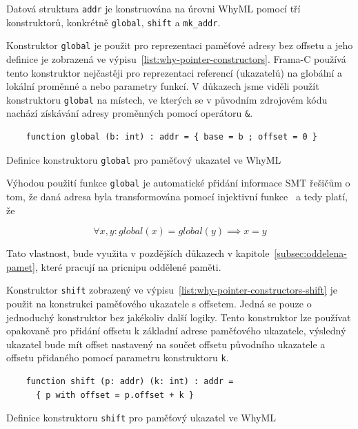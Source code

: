 Datová struktura \texttt{addr} je konstruována na úrovni WhyML pomocí tří konstruktorů,
konkrétně \texttt{global}, \texttt{shift} a \texttt{mk\_addr}.

Konstruktor \texttt{global} je použit pro reprezentaci paměťové adresy bez offsetu
a jeho definice je zobrazená ve výpisu~\ref{list:why-pointer-constructors}.
Frama\mbox{-}C používá tento konstruktor nejčastěji
pro reprezentaci referencí (ukazatelů) na globální a lokální proměnné a nebo parametry funkcí.
V důkazech jsme viděli použít konstruktoru \texttt{global} na místech,
ve kterých se v původním zdrojovém kódu nachází získávání adresy proměnných pomocí operátoru \texttt{\&}.

\begin{listing}[H]
    \begin{verbatim}
    function global (b: int) : addr = { base = b ; offset = 0 }
    \end{verbatim}
    \caption{Definice konstruktoru \texttt{global} pro paměťový ukazatel ve WhyML}
    \label{list:why-pointer-constructors}
\end{listing}

Výhodou použití funkce \texttt{global} je automatické přidání informace SMT řešičům o tom,
že daná adresa byla transformována pomocí injektivní funkce~\cite{BlanchardWP2024}
a tedy platí, že

\begin{equation*}
    \forall x, y : global(x) = global(y) \implies x = y
\end{equation*}

Tato vlastnost, bude využita v pozdějších důkazech v kapitole~\ref{subsec:oddelena-pamet},
které pracují na pricnipu oddělené paměti.

Konstruktor \texttt{shift} zobrazený ve výpisu~\ref{list:why-pointer-constructors-shift}
je použit na konstrukci paměťového ukazatele s offsetem.
Jedná se pouze o jednoduchý konstruktor bez jakékoliv další logiky.
Tento konstruktor lze používat opakovaně pro přidání offsetu k základní adrese paměťového ukazatele,
výsledný ukazatel bude mít offset nastavený na součet offsetu původního ukazatele
a offsetu přidaného pomocí parametru konstruktoru \texttt{k}.

\begin{listing}[H]
    \begin{verbatim}
    function shift (p: addr) (k: int) : addr =
      { p with offset = p.offset + k }
    \end{verbatim}
    \caption{Definice konstruktoru \texttt{shift} pro paměťový ukazatel ve WhyML}
    \label{list:why-pointer-constructors-shift}
\end{listing}

